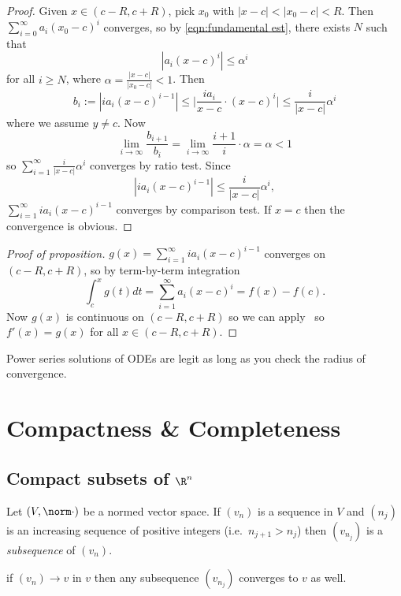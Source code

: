 \documentclass[a4paper]{article}
\theoremstyle{definition}
\begin{document}
\begin{proof}
  Given \(x\in(c-R,c+R)\), pick \(x_0\) with \(|x-c| < |x_0-c| < R\). Then \(\sum_{i=0}^{\infty}a_i(x_0-c)^i \) converges, so by \ref{eqn:fundamental est}, there exists \(N\) such that
  \[
    |a_i(x-c)^i| \leq \alpha^i
  \]
  for all \(i\geq N\), where \(\alpha = \frac{|x-c|}{|x_0-c|}<1\). Then
  \[
    b_i:= |i a_i (x-c)^{i-1}| \leq \Big| \frac{i a_i}{x-c}\cdot(x-c)^i \Big| \leq \frac{i}{|x-c|}\alpha^i
  \]
  where we assume \(y\neq c\). Now
  \[
    \lim_{i\to\infty} \frac{b_{i+1}}{b_i} = \lim_{i\to\infty} \frac{i+1}{i}\cdot\alpha = \alpha<1
  \]
  so \(\sum_{i=1}^{\infty}\frac{i}{|x-c|}\alpha^i \) converges by ratio test. Since
  \[
    |i a_i(x-c)^{i-1}| \leq \frac{i}{|x-c|}\alpha^i,
  \]
  \(\sum_{i=1}^{\infty}i a_i(x-c)^{i-1} \) converges by comparison test. If \(x=c\) then the convergence is obvious.
\end{proof}

\begin{proof}[Proof of proposition]
  \(g(x) = \sum_{i=1}^{\infty}i a_i (x-c)^{i-1} \) converges on \((c-R,c+R)\), so by term-by-term integration
  \[
    \int_{c}^{x} g(t) dt = \sum_{i=1}^{\infty}a_i(x-c)^i = f(x) - f(c).
  \]
  Now \(g(x)\) is continuous on \((c-R, c+R)\) so we can apply~ so \(f'(x) = g(x)\) for all \(x\in(c-R,c+R)\).
\end{proof}

\begin{application}
  Power series solutions of ODEs are legit as long as you check the radius of convergence.
\end{application}

\section{Compactness \& Completeness}

\subsection{Compact subsets of \texorpdfstring{\(\R^n\)}{R\^{}n}}

Let \((V, \norm \cdot)\) be a normed vector space. If \((v_n)\) is a sequence in \(V\) and \((n_j)\) is an increasing sequence of positive integers (i.e.\ \(n_{j+1}>n_j\)) then \((v_{n_j})\) is a \emph{subsequence} of \((v_n)\).

\begin{ex}
  if \((v_n)\to v\) in \(v\) then any subsequence \((v_{n_j})\) converges to \(v\) as well.
\end{ex}
\end{document}

